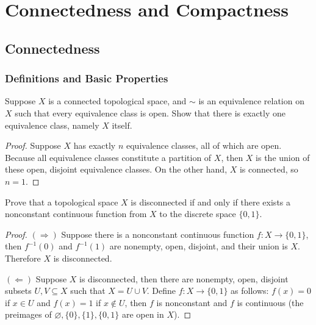 \chapter{Connectedness and Compactness}

\section*{Connectedness}

\subsection*{Definitions and Basic Properties}

\begin{exercise}{4.3}
    Suppose $X$ is a connected topological space, and $\sim$ is an equivalence relation on $X$ such that every equivalence class is open. Show that there is exactly one equivalence class, namely $X$ itself.
\end{exercise}

\begin{proof}
    Suppose $X$ has exactly $n$ equivalence classes, all of which are open. Because all equivalence classes constitute a partition of $X$, then $X$ is the union of these open, disjoint equivalence classes. On the other hand, $X$ is connected, so $n = 1$.
\end{proof}

\begin{exercise}{4.4}
    Prove that a topological space $X$ is disconnected if and only if there exists a nonconstant continuous function from $X$ to the discrete space $\{ 0, 1 \}$.
\end{exercise}

\begin{proof}
    $(\Rightarrow)$ Suppose there is a nonconstant continuous function $f: X\to \{ 0, 1 \}$, then $f^{-1}(0)$ and $f^{-1}(1)$ are nonempty, open, disjoint, and their union is $X$. Therefore $X$ is disconnected.

    $(\Leftarrow)$ Suppose $X$ is disconnected, then there are nonempty, open, disjoint subsets $U, V\subseteq X$ such that $X = U\cup V$. Define $f: X\to \{ 0, 1 \}$ as follows: $f(x) = 0$ if $x\in U$ and $f(x) = 1$ if $x\notin U$, then $f$ is nonconstant and $f$ is continuous (the preimages of $\varnothing, \{0\}, \{1\}, \{0,1\}$ are open in $X$).
\end{proof}


